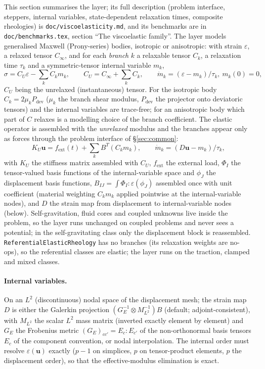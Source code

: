 \documentclass[11pt]{article}
\numberwithin{equation}{section}
\theoremstyle{remark}
\newcommand{\eps}{\varepsilon}
\newcommand{\vu}{\mathbf{u}}
\newcommand{\code}[1]{\texttt{#1}}
\begin{document}
This section summarises the layer; its full description (problem
interface, steppers, internal variables, state-dependent relaxation times,
composite rheologies) is \code{doc/viscoelasticity.md}, and its benchmarks
are in \code{doc/benchmarks.tex}, section ``The viscoelastic family''.
The layer models generalised Maxwell (Prony-series) bodies, isotropic or
anisotropic: with strain $\eps$, a relaxed tensor $C_\infty$, and for each
\emph{branch} $k$ a relaxable tensor $C_k$, a relaxation time $\tau_k$ and a
symmetric-tensor internal variable $m_k$,
\begin{equation}
  \sigma = C_U\eps - \sum_k C_km_k, \qquad C_U = C_\infty + \sum_kC_k,
  \qquad \dot m_k = (\eps - m_k)/\tau_k,\ m_k(0) = 0 ,
\end{equation}
$C_U$ being the unrelaxed (instantaneous) tensor. For the isotropic body
$C_k = 2\mu_kP_{\mathrm{dev}}$ ($\mu_k$ the branch shear modulus,
$P_{\mathrm{dev}}$ the projector onto deviatoric tensors) and the internal
variables are trace-free; for an anisotropic body which part of $C$ relaxes
is a modelling choice of the branch coefficient. The elastic operator is
assembled with the \emph{unrelaxed} modulus and the branches appear only as
forces through the problem interface of \S\ref{sec:common}:
\begin{equation}
  K_U\vu = f_{\mathrm{ext}}(t) + \sum_kB^T(C_km_k), \qquad
  \dot m_k = (D\vu - m_k)/\tau_k,
\end{equation}
with $K_U$ the stiffness matrix assembled with $C_U$, $f_{\mathrm{ext}}$
the external load, $\Phi_I$ the tensor-valued basis functions of the
internal-variable space and $\phi_J$ the displacement basis functions,
$B_{IJ} = \int\Phi_I:\eps(\phi_J)$ assembled once with unit coefficient
(material weighting $C_km_k$ applied pointwise at the internal-variable
nodes), and $D$ the strain map from displacement to internal-variable
nodes (below). Self-gravitation, fluid cores and coupled unknowns live inside
the problem, so the layer runs unchanged on coupled problems and never sees
a potential; in the self-gravitating class only the displacement block is
reassembled. \code{ReferentialElasticRheology} has no branches (its
relaxation weights are no-ops), so the referential classes are elastic;
the layer runs on the traction, clamped and mixed classes.

\paragraph{Internal variables.} On an $L^2$ (discontinuous) nodal space of
the displacement mesh; the strain map $D$ is either the Galerkin projection
$(G_E^{-1}\otimes M_{L^2}^{-1})B$ (default; adjoint-consistent), with
$M_{L^2}$ the scalar $L^2$ mass matrix (inverted exactly element by
element) and $G_E$ the Frobenius metric $(G_E)_{cc'} = E_c:E_{c'}$ of the
non-orthonormal basis tensors $E_c$ of the component convention, or nodal
interpolation. The internal order must resolve $\eps(\vu)$ exactly ($p-1$
on simplices, $p$ on tensor-product elements, $p$ the displacement order),
so that the effective-modulus elimination is exact.
\end{document}
